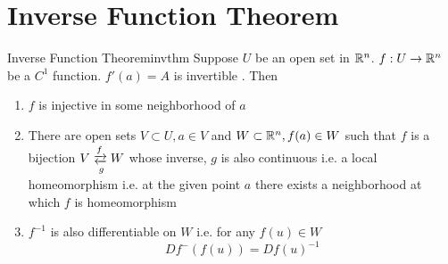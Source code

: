 \chapter{Inverse Function Theorem}


\begin{theorem}{Inverse Function Theorem}{invthm}
	Suppose $U$ be an open set in $\mathbb{R}^n$. $f:U\to \mathbb{R}^n$ be a $C^1$ function. $f'(a)=A$ is invertible . Then \begin{enumerate}[label=\bfseries\tiny\protect\circled{\small\arabic*}]
	\item $f$ is injective in some neighborhood of $a$
	\item There are open sets $V\subset U, a\in V$ and $W\subset \mathbb{R}^n, f(a)\in W$ such that $f$ is a bijection $V\mathrel{\raisebox{2pt}{$\xrightarrow{f}$}
		\llap{\raisebox{-2pt}{$\xleftarrow[g]{}$}}}W$ whose inverse, $g$ is also continuous i.e. a local homeomorphism  i.e. at the given point $a$  there exists a neighborhood  at which $f$ is homeomorphism
	\item $f^{-1}$ is also differentiable  on $W$  i.e. for any $f(u)\in W$ $$Df^{-}(f(u))=Df(u)^{-1}$$
\end{enumerate}
\end{theorem}


